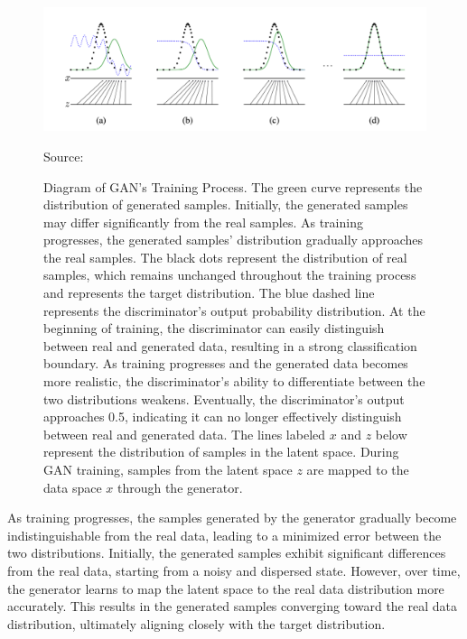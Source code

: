 \begin{figure}[H]
    \centering
    \includegraphics[width=1.2\linewidth]{./Images/data_distribution.jpg}
    \caption{ Diagram of GAN's Training Process. 
    The green curve represents the distribution of generated samples. Initially, the generated samples may differ significantly from the real samples. As training progresses, the generated samples' distribution gradually approaches the real samples.
    The black dots represent the distribution of real samples, which remains unchanged throughout the training process and represents the target distribution.
    The blue dashed line represents the discriminator's output probability distribution. At the beginning of training, the discriminator can easily distinguish between real and generated data, resulting in a strong classification boundary. As training progresses and the generated data becomes more realistic, the discriminator's ability to differentiate between the two distributions weakens. Eventually, the discriminator's output approaches 0.5, indicating it can no longer effectively distinguish between real and generated data.
    The lines labeled $x$ and $z$ below represent the distribution of samples in the latent space. During GAN training, samples from the latent space $z$ are mapped to the data space $x$ through the generator.
    }
    \label{fig:gan_training_process}
    \vspace{1pt} %
    \small{Source: \cite{goodfellow2014generative}}
\end{figure}

As training progresses, the samples generated by the generator gradually become indistinguishable from the real data, leading to a minimized error between the two distributions. Initially, the generated samples exhibit significant differences from the real data, starting from a noisy and dispersed state. However, over time, the generator learns to map the latent space to the real data distribution more accurately. This results in the generated samples converging toward the real data distribution, ultimately aligning closely with the target distribution.


